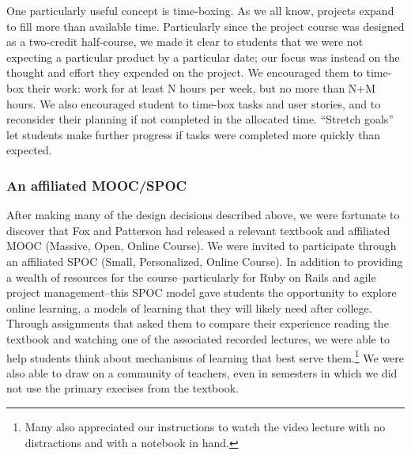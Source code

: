One particularly useful concept is time-boxing.
As we all know, projects expand to fill more than available time.
Particularly since the project course was designed as a two-credit 
half-course, we made it clear to students that we were not expecting
a particular product by a particular date; our focus was instead on the
thought and effort they expended on the project.  We encouraged them
to time-box their work: work for at least N hours per week, but no more
than N+M hours.  We also encouraged student to time-box tasks 
and user stories, and to reconsider their planning if not completed in the 
allocated time.  ``Stretch goals'' let students make further progress 
if tasks were completed more quickly than expected.

\subsubsection{An affiliated MOOC/SPOC}

After making many of the design decisions described above, we were
fortunate to discover that Fox and Patterson had released a relevant
textbook \cite{saasbook} and affiliated MOOC (Massive, Open, Online
Course).  We were invited to participate through an affiliated SPOC
(Small, Personalized, Online Course).  In addition to providing a
wealth of resources for the course--particularly for Ruby on Rails
and agile project management--this SPOC model gave students the
opportunity to explore online learning, a models of learning
that they will likely need after college.  Through
assignments that asked them to compare their experience reading the
textbook and watching one of the associated recorded lectures, we
were able to help students think about mechanisms of learning that
best serve them.\footnote{Many also appreciated our instructions
to watch the video lecture with no distractions and with a notebook
in hand.}  We were also able to draw on a community of teachers,
even in semesters in which we did not use the primary execises from
the textbook.

